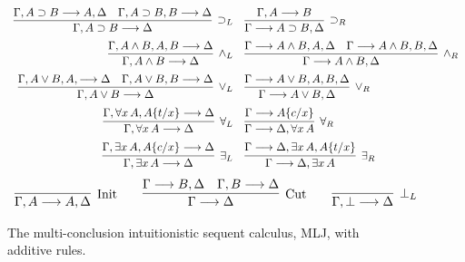 \documentclass{llncs}
\begin{document}







\newpage
\appendix

\begin{figure}
\[
\begin{array} {r@{\quad}l}
\infer[{\supset_L}]{\Gamma, A\supset B \longrightarrow \Delta}{\Gamma,
A\supset B \longrightarrow A, \Delta \quad \Gamma,A\supset B, B \longrightarrow
\Delta }
&
\infer[{\supset_R}]{\Gamma \longrightarrow A \supset B, \Delta}{\Gamma, A
\longrightarrow B}
\\[5pt]
\infer[{\land_L}]{\Gamma, A \land B \longrightarrow \Delta}{\Gamma, A \land
B, A,B \longrightarrow \Delta }
&
\infer[{\land_R}]{\Gamma \longrightarrow A \land B, \Delta}{\Gamma \longrightarrow
A \land B, A, \Delta \quad \Gamma \longrightarrow A \land B,B, \Delta}
\\
[5pt]
\infer[{\lor_L}]{\Gamma, A \lor B \longrightarrow  \Delta}{\Gamma, A \lor B,
A, \longrightarrow \Delta \quad \Gamma, A \lor B,B \longrightarrow  \Delta}
&
\infer[{\lor_R}]{\Gamma \longrightarrow A \lor B, \Delta}{\Gamma \longrightarrow A
\lor B, A,B, \Delta }
\\
[5pt]
\infer[{\forall_L}]{\Gamma, \forall x\,A \longrightarrow \Delta}{\Gamma,
\forall x\,A, A\{t/x\} \longrightarrow \Delta} 
&
\infer[{\forall_R}]{\Gamma \longrightarrow \Delta, \forall x\,A}{\Gamma
\longrightarrow A\{c/x\}}
\\
[5pt]
\infer[{\exists_L}]{\Gamma, \exists x\, A \longrightarrow
\Delta}{\Gamma, \exists x\, A , A\{c/ x\} \longrightarrow \Delta} 
&
\infer[{\exists_R}]{\Gamma \longrightarrow \Delta, \exists x\, A}
{\Gamma \longrightarrow \Delta, \exists x\, A, A \{t/x\}}
\end{array}
\]
\[
\begin{array}{c@{\qquad}c@{\qquad}c}
 \infer[{\textrm{Init}}]{\Gamma,A \longrightarrow A, \Delta}{} 
&
\infer[{\textrm{Cut}}]{\Gamma \longrightarrow \Delta}{\Gamma
\longrightarrow B,\Delta \quad \Gamma, B \longrightarrow \Delta}
&
\infer[{\bot_L}]{\Gamma,\bot \longrightarrow \Delta}{} 
\end{array}
\]
\caption{The multi-conclusion intuitionistic sequent calculus, MLJ,
with additive rules.}\label{Fig:mLJ}
\end{figure}
\end{document}
